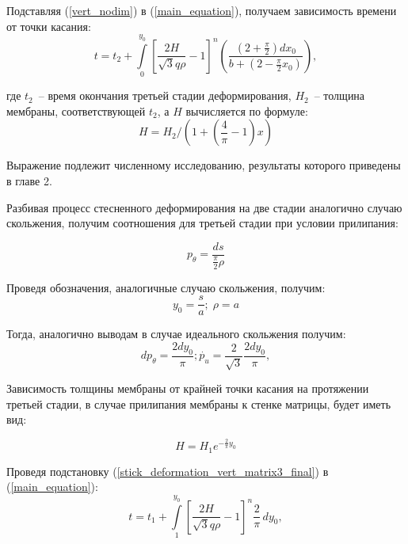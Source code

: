 	Подставляя (\ref{vert_nodim}) в (\ref{main_equation}), получаем зависимость времени от точки касания:
	\begin{equation}
	t = t_2+ \int\limits_0^{y_0}\left[ \dfrac{2H}{\sqrt3 q \rho} -1\right]^n\left(\dfrac{\left( 2+\frac{\pi}{2}\right)dx_0}{b+\left(2-\frac{\pi}{2}x_0\right)}\right),
	\end{equation}
	
где $t_2$~-- время окончания третьей стадии деформирования, $H_2$~-- толщина мембраны, соответствующей $t_2$, а $H$ вычисляется по формуле:
\begin{equation}
 H = H_2/(1+(\dfrac{4}{\pi} - 1)x)
\end{equation}   

Выражение подлежит численному исследованию, результаты которого приведены в главе 2.

Разбивая процесс стесненного деформирования на две стадии аналогично случаю скольжения, получим соотношения для третьей стадии при условии прилипания:

\begin{equation}
p_\theta = \dfrac{ds}{\frac{\pi}{2}\rho}
\label{stick_deformation_vert_matrix3}
\end{equation}

Проведя обозначения, аналогичные случаю скольжения, получим: 
\begin{equation}
y_0 = \dfrac{s}{a}; \; \rho = a
\end{equation}

Тогда, аналогично выводам в случае идеального скольжения получим:
\begin{equation}
	dp_\theta = \dfrac{2dy_0}{\pi};
	\dot{p_u} = \dfrac{2}{\sqrt 3}\dfrac{2dy_0}{\pi},
\label{stick_deformation_vert_matrix3_final}
\end{equation}

Зависимость толщины мембраны от крайней точки касания на протяжении третьей стадии,
 в случае прилипания мембраны к стенке матрицы, будет иметь вид:
    
 \begin{equation}
   H = H_1 e^{-\frac{2}{\pi}y_0}
   \end{equation}
   
   Проведя подстановку (\ref{stick_deformation_vert_matrix3_final}) в (\ref{main_equation}):
 \begin{equation}
   t = t_1 + \int\limits^{y_0}_1 \left[ \dfrac{2H}{\sqrt3 q \rho} -1\right]^n\dfrac{2}{\pi}\,dy_0,
   \end{equation}

